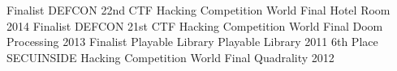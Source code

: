 \begin{cvhonors}
  \cvhonor
    {Finalist}
    {DEFCON 22nd CTF Hacking Competition World Final}
    {Hotel Room}
    {2014}
  \cvhonor
    {Finalist}
    {DEFCON 21st CTF Hacking Competition World Final}
    {Doom Processing}
    {2013}
  \cvhonor
    {Finalist}
    {Playable Library}
    {Playable Library}
    {2011}
  \cvhonor
    {6th Place}
    {SECUINSIDE Hacking Competition World Final}
    {Quadrality}
    {2012}
\end{cvhonors}